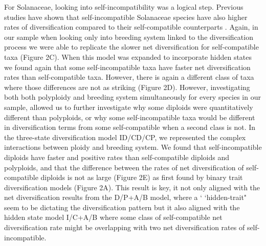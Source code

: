 For Solanaceae, looking into self-incompatibility was a logical step.
Previous studies have shown that self-incompatible Solanaceae species have also higher rates of diversification compared to their self-compatible counterparts \citep{goldberg_2012}. 
Again, in our sample when looking only into breeding system linked to the diversification process we were able to replicate the slower net diversification for self-compatible taxa (Figure 2C). When this model was expanded to incorporate hidden states we found again that some self-incompatible taxa have faster net diversification rates than self-compatible taxa. However, there is again a  different class of taxa where those differences are not as striking (Figure 2D).  However, investigating both  both polyploidy and breeding system simultaneously for every species in our sample, allowed us to further investigate why some diploids were quantitatively different than polyploids, or why some self-incompatible taxa would be different in diversification terms from some self-compatible when a second class is not.
In the three-state diversification model ID/CD/CP, we represented the complex interactions between ploidy and breeding system. We found that self-incompatible diploids have faster and positive rates than self-compatible diploids and polyploids, and that the difference between the  rates of net diversification of self-compatible diploids is not as large (Figure 2E) as first found by binary trait diversification models (Figure 2A).
This result is key, it not only aligned with the net diversification results from the D/P+A/B model, where a `	`hidden-trait" seem to be dictating the diversification pattern but it also aligned with the hidden state model I/C+A/B where some class of self-compatible net diversification rate might be overlapping with two net diversification rates of self-incompatible.





